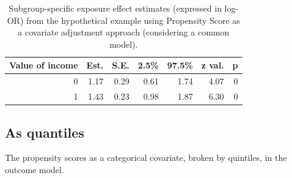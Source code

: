 \documentclass[
  letterpaper,
  DIV=11,
  numbers=noendperiod]{scrreprt}
\begin{document}
\hypertarget{tbl-cont-var2}{}
\begin{table}[!h]
\caption{\label{tbl-cont-var2}Subgroup-specific exposure effect estimates (expressed in log-OR) from
the hypothetical example using Propensity Score as a covariate
adjustment approach (considering a common model). }\tabularnewline

\centering
\begin{tabular}{rrrrrrr}
\toprule
Value of income & Est. & S.E. & 2.5\% & 97.5\% & z val. & p\\
\midrule
0 & 1.17 & 0.29 & 0.61 & 1.74 & 4.07 & 0\\
1 & 1.43 & 0.23 & 0.98 & 1.87 & 6.30 & 0\\
\bottomrule
\end{tabular}
\end{table}

\hypertarget{as-quantiles}{%
\subsection{As quantiles}\label{as-quantiles}}

The propensity scores as a categorical covariate, broken by quintiles,
in the outcome model.
\end{document}
